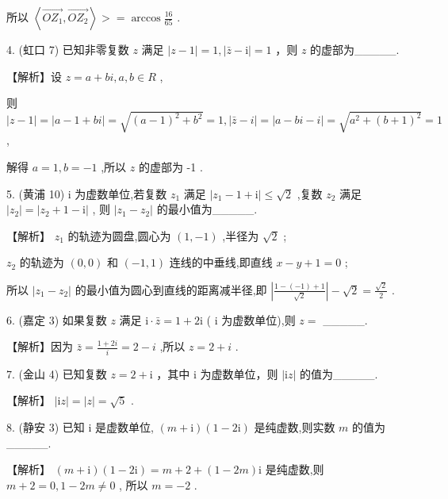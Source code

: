 \documentclass[10pt]{article}
\begin{document}
所以 \(\left\langle  {\overrightarrow{O{Z}_{1}},\overrightarrow{O{Z}_{2}}}\right\rangle   >  = \arccos \frac{16}{65}\) .

4. (虹口 7) 已知非零复数 \(z\) 满足 \(\left| {z - 1}\right|  = 1,\left| {\bar{z} - \mathrm{i}}\right|  = 1\) ，则 \(z\) 的虚部为\_\_\_\_\_.

【解析】设 \(z = a + {bi},a,b \in  R\) ,

则 \(\left| {z - 1}\right|  = \left| {a - 1 + {bi}}\right|  = \sqrt{{\left( a - 1\right) }^{2} + {b}^{2}} = 1,\left| {\bar{z} - i}\right|  = \left| {a - {bi} - i}\right|  = \sqrt{{a}^{2} + {\left( b + 1\right) }^{2}} = 1\) ,

解得 \(a = 1,b =  - 1\) ,所以 \(z\) 的虚部为 -1 .

5. (黄浦 10) \(\mathrm{i}\) 为虚数单位,若复数 \({z}_{1}\) 满足 \(\left| {{z}_{1} - 1 + \mathrm{i}}\right|  \leq  \sqrt{2}\) ,复数 \({z}_{2}\) 满足 \(\left| {z}_{2}\right|  = \left| {{z}_{2} + 1 - \mathrm{i}}\right|\) , 则 \(\left| {{z}_{1} - {z}_{2}}\right|\) 的最小值为\_\_\_\_\_.

【解析】 \({z}_{1}\) 的轨迹为圆盘,圆心为 \(\left( {1, - 1}\right)\) ,半径为 \(\sqrt{2}\) ;

\({z}_{2}\) 的轨迹为 \(\left( {0,0}\right)\) 和 \(\left( {-1,1}\right)\) 连线的中垂线,即直线 \(x - y + 1 = 0\) ;

所以 \(\left| {{z}_{1} - {z}_{2}}\right|\) 的最小值为圆心到直线的距离减半径,即 \(\left| \frac{1 - \left( {-1}\right)  + 1}{\sqrt{2}}\right|  - \sqrt{2} = \frac{\sqrt{2}}{2}\) .

6. (嘉定 3) 如果复数 \(z\) 满足 \(\mathrm{i} \cdot  \bar{z} = 1 + 2\mathrm{i}\) ( \(\mathrm{i}\) 为虚数单位),则 \(z =\) \_\_\_\_\_.

【解析】因为 \(\bar{z} = \frac{1 + {2i}}{i} = 2 - i\) ,所以 \(z = 2 + i\) .

7. (金山 4) 已知复数 \(z = 2 + \mathrm{i}\) ，其中 \(\mathrm{i}\) 为虚数单位，则 \(\left| {\mathrm{i}z}\right|\) 的值为\_\_\_\_\_.

【解析】 \(\left| {\mathrm{i}z}\right|  = \left| z\right|  = \sqrt{5}\) .

8. (静安 3) 已知 \(\mathrm{i}\) 是虚数单位, \(\left( {m + \mathrm{i}}\right) \left( {1 - 2\mathrm{i}}\right)\) 是纯虚数,则实数 \(m\) 的值为\_\_\_\_\_.

【解析】 \(\left( {m + \mathrm{i}}\right) \left( {1 - 2\mathrm{i}}\right)  = m + 2 + \left( {1 - {2m}}\right) \mathrm{i}\) 是纯虚数,则 \(m + 2 = 0,1 - {2m} \neq  0\) , 所以 \(m =  - 2\) .
\end{document}
